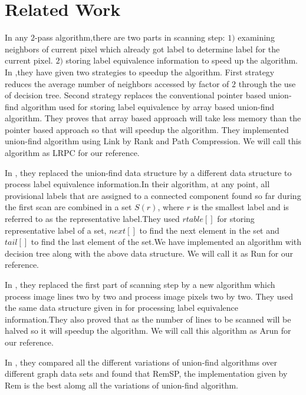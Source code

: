 \section{Related Work}
\label{sec:related_works}

In any $2$-pass algorithm,there are two parts in scanning step: $1)$ examining neighbors of current pixel which already
got label to determine label for the current pixel. $2)$ storing label equivalence information to speed up the algorithm. 
In \cite{Wu2009_LRPC},they have given two strategies to speedup the algorithm. First strategy reduces the average number
of neighbors accessed by factor of $2$ through the use of decision tree. Second strategy replaces the conventional pointer
based union-find algorithm used for storing label equivalence by array based union-find algorithm. They proves that array 
based approach will take less memory than the pointer based approach so that will speedup the algorithm. They implemented
union-find algorithm using Link by Rank and Path Compression. We will call this algorithm as LRPC for our reference.

In \cite{He2008_Run}, they replaced the union-find data structure by a different data structure to process label 
equivalence information.In their algorithm, at any point, all provisional labels that are assigned to a connected 
component found so far during the first scan are combined in a set $S(r)$, where $r$ is the smallest label and is 
referred to as the representative label.They used $rtable[]$ for storing representative label of a set, $next[]$ to 
find the next element in the set and $tail[]$ to find the last element of the set.We have implemented an algorithm 
with decision tree along with the above data structure. We will call it as Run for our reference.

In \cite{He2012_ARun}, they replaced the first part of scanning step by a new algorithm which process image lines two
by two and process image pixels two by two. They used the same data structure given in \cite{He2008_Run} for 
processing label equivalence information.They also proved that as the number of lines to be scanned will be halved so 
it will speedup the algorithm. We will call this algorithm as Arun for our reference.

In \cite{Patwary2010_RemSP}, they compared all the different variations of union-find algorithms over different graph 
data sets and found that RemSP, the implementation given by Rem is the best alomg all the variations of union-find 
algorithm.

